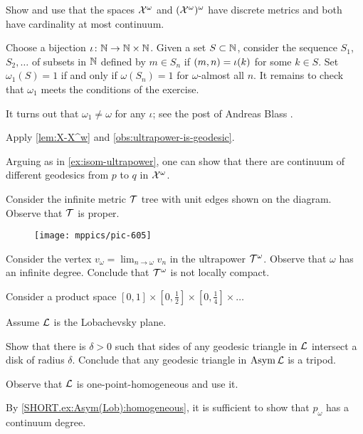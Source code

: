 Show and use that the spaces $\mathcal{X}^\omega$ and $(\mathcal{X}^\omega)^\omega$ have discrete metrics and both have cardinality at most continuum.


Choose a bijection $\iota\colon\mathbb{N}\to \mathbb{N}\times \mathbb{N}$.
Given a set $S\subset \mathbb{N}$, consider the sequence $S_1$, $S_2,\dots$ of subsets in $\mathbb{N}$ defined by $m\in S_n$ if $(m,n)\z=\iota(k)$ for some $k\in S$.
Set $\omega_1(S)=1$ if and only if $\omega(S_n)=1$ for $\omega$-almost all $n$.
It remains to check that $\omega_1$ meets the conditions of the exercise.

It turns out that $\omega_1\ne \omega$ for any $\iota$;
see the post of Andreas Blass \cite{blass}.

Apply \ref{lem:X-X^w} and \ref{obs:ultrapower-is-geodesic}.

Arguing as in \ref{ex:isom-ultrapower}, one can show that there are continuum of different geodesics from $p$ to $q$ in $\mathcal{X}^\omega$.

 Consider the infinite metric $\mathcal{T}$ tree with unit edges shown
on the diagram.
Observe that $\mathcal{T}$ is proper.

\begin{figure}[ht!]
\vskip-0mm
\centering
\texttt{[image: mppics/pic-605]}
\end{figure}

Consider the vertex $v_\omega=\lim_{n\to\omega}v_n$ in the ultrapower $\mathcal{T}^\omega$.
Observe that $\omega$ has an infinite degree.
Conclude that $\mathcal{T}^\omega$ is not locally compact.

Consider a product space $[0,1]\times[0,\tfrac12]\times[0,\tfrac14]\times\dots$

 Assume $\mathcal{L}$ is the Lobachevsky plane.

Show that there is $\delta>0$ such that sides of any geodesic triangle in $\mathcal{L}$ intersect a disk of radius $\delta$.
Conclude that any geodesic triangle in $\mathop{\rm Asym}\nolimits\mathcal{L}$ is a tripod.

 Observe that $\mathcal{L}$ is one-point-homogeneous and use it.

By \ref{SHORT.ex:Asym(Lob):homogeneous}, it is sufficient to show that $p_\omega$ has a continuum degree.

